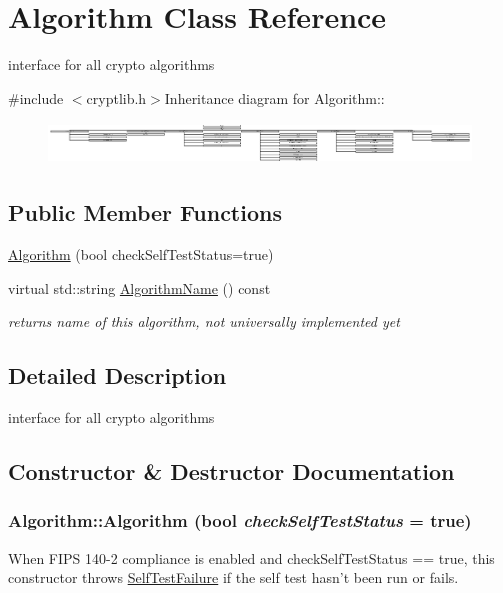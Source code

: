 \hypertarget{class_algorithm}{
\section{Algorithm Class Reference}
\label{class_algorithm}
}


interface for all crypto algorithms  


{\ttfamily \#include $<$cryptlib.h$>$}Inheritance diagram for Algorithm::\begin{figure}[H]
\begin{center}
\leavevmode
\includegraphics[height=1.1123cm]{class_algorithm}
\end{center}
\end{figure}
\subsection*{Public Member Functions}
\begin{DoxyCompactItemize}
\item 
\hyperlink{class_algorithm_a1c77f5117ca2cd881baf26a364cfc606}{Algorithm} (bool checkSelfTestStatus=true)
\item 
\hypertarget{class_algorithm_acd21c6715add4884fa043eaf51655039}{
virtual std::string \hyperlink{class_algorithm_acd21c6715add4884fa043eaf51655039}{AlgorithmName} () const }
\label{class_algorithm_acd21c6715add4884fa043eaf51655039}

\begin{DoxyCompactList}\small\item\em returns name of this algorithm, not universally implemented yet \item\end{DoxyCompactList}\end{DoxyCompactItemize}


\subsection{Detailed Description}
interface for all crypto algorithms 

\subsection{Constructor \& Destructor Documentation}
\hypertarget{class_algorithm_a1c77f5117ca2cd881baf26a364cfc606}{
\subsubsection[{Algorithm}]{\setlength{\rightskip}{0pt plus 5cm}Algorithm::Algorithm (bool {\em checkSelfTestStatus} = {\ttfamily true})}}
\label{class_algorithm_a1c77f5117ca2cd881baf26a364cfc606}
When FIPS 140-\/2 compliance is enabled and checkSelfTestStatus == true, this constructor throws \hyperlink{class_self_test_failure}{SelfTestFailure} if the self test hasn't been run or fails. 

